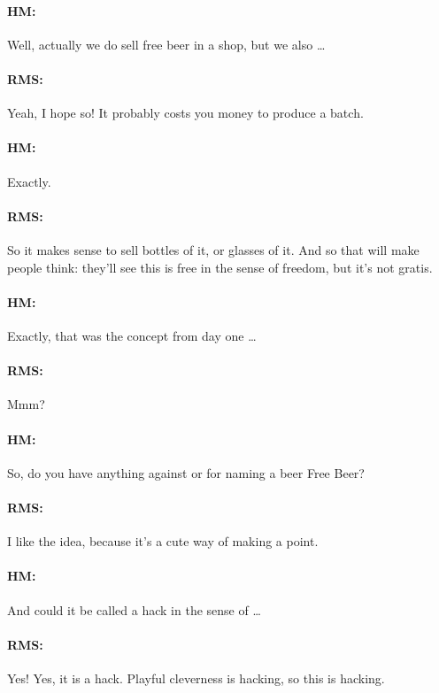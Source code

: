 \paragraph{HM:}{Well, actually we do sell free beer in a shop, but we also
\dots}

\paragraph{RMS:}{Yeah, I hope so! It probably costs you money to produce a
batch.}

\paragraph{HM:}{Exactly.}

\paragraph{RMS:}{So it makes sense to sell bottles of it, or glasses of it. And
so that will make people think: they'll see this is free in the sense of
freedom, but it's not gratis.}

\paragraph{HM:}{Exactly, that was the concept from day one \dots}

\paragraph{RMS:}{Mmm?}

\paragraph{HM:}{So, do you have anything against or for naming a beer Free
Beer?}

\paragraph{RMS:}{I like the idea, because it's a cute way of making a point.}

\paragraph{HM:}{And could it be called a hack in the sense of \dots}

\paragraph{RMS:}{Yes! Yes, it is a hack. Playful cleverness is hacking, so this
is hacking.}

